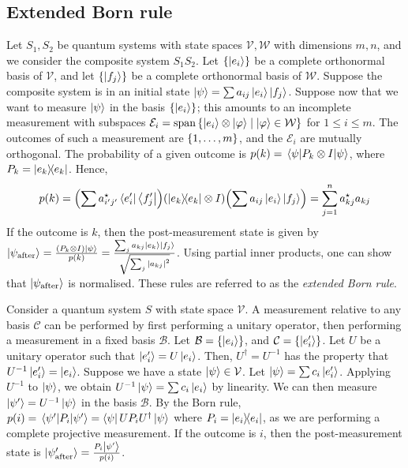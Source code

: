 \subsection{Extended Born rule}
Let \( S_1, S_2 \) be quantum systems with state spaces \( \mathcal V, \mathcal W \) with dimensions \( m, n \), and we consider the composite system \( S_1 S_2 \).
Let \( \qty{\ket{e_i}} \) be a complete orthonormal basis of \( \mathcal V \), and let \( \qty{\ket{f_j}} \) be a complete orthonormal basis of \( \mathcal W \).
Suppose the composite system is in an initial state \( \ket{\psi} = \sum a_{ij} \ket{e_i} \ket{f_j} \).
Suppose now that we want to measure \( \ket{\psi} \) in the basis \( \qty{\ket{e_i}} \); this amounts to an incomplete measurement with subspaces \( \mathcal E_i = \operatorname{span} \qty{\ket{e_i} \otimes \ket{\varphi} \mid \ket{\varphi} \in \mathcal W} \) for \( 1 \leq i \leq m \).
The outcomes of such a measurement are \( \qty{1, \dots, m} \), and the \( \mathcal E_i \) are mutually orthogonal.
The probability of a given outcome is \( p(k) = \ev{P_k \otimes I}{\psi} \), where \( P_k = \op{e_k}{e_k} \).
Hence,
\[ p(k) = \qty(\sum a_{i'j'}^\star \bra{e_i'} \bra{f_j'}) \qty(\op{e_k}{e_k} \otimes I) \qty(\sum a_{ij} \ket{e_i} \ket{f_j}) = \sum_{j=1}^n a_{kj}^\star a_{kj} \]
If the outcome is \( k \), then the post-measurement state is given by \( \ket{\psi_{\text{after}}} = \frac{(P_k \otimes I)\ket{\psi}}{p(k)} = \frac{\sum_j a_{kj} \ket{e_k} \ket{f_j}}{\sqrt{\sum_j \abs{a_{kj}}^2}} \).
Using partial inner products, one can show that \( \ket{\psi_{\text{after}}} \) is normalised.
These rules are referred to as the \emph{extended Born rule}.

Consider a quantum system \( S \) with state space \( \mathcal V \).
A measurement relative to any basis \( \mathcal C \) can be performed by first performing a unitary operator, then performing a measurement in a fixed basis \( \mathcal B \).
Let \( \mathcal B = \qty{\ket{e_i}} \), and \( \mathcal C = \qty{\ket{e_i'}} \).
Let \( U \) be a unitary operator such that \( \ket{e_i'} = U \ket{e_i} \).
Then, \( U^\dagger = U^{-1} \) has the property that \( U^{-1} \ket{e_i'} = \ket{e_i} \).
Suppose we have a state \( \ket{\psi} \in \mathcal V \).
Let \( \ket{\psi} = \sum c_i \ket{e_i'} \).
Applying \( U^{-1} \) to \( \ket{\psi} \), we obtain \( U^{-1} \ket{\psi} = \sum c_i \ket{e_i} \) by linearity.
We can then measure \( \ket{\psi'} = U^{-1} \ket{\psi} \) in the basis \( \mathcal B \).
By the Born rule, \( p(i) = \ev{P_i}{\psi'} = \bra{\psi} U P_i U^\dagger \ket{\psi} \) where \( P_i = \op{e_i}{e_i} \), as we are performing a complete projective measurement.
If the outcome is \( i \), then the post-measurement state is \( \ket{\psi'_{\text{after}}} = \frac{P_i \ket{\psi'}}{p(i)} \).

